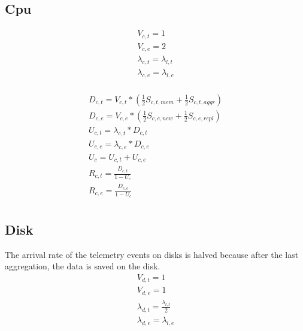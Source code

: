 \documentclass[11pt]{article}
\begin{document}
\subsection{Cpu}

\begin{equation}
    \begin{array}{l}
        V_{c, t} = 1 \\
        V_{c, e} = 2 \\ %
        \lambda_{c, t} = \lambda_{l, t} \\
        \lambda_{c, e} = \lambda_{l, e} \\
    \end{array}
\end{equation}

\begin{equation}
    \begin{array}{l}
        D_{c, t} = V_{c, t} * (\frac{1}{2}S_{c, t, mem} + \frac{1}{2}S_{c, t, aggr}) \\ %
        D_{c, e} = V_{c, e} * (\frac{1}{2}S_{c, e, new} + \frac{1}{2}S_{c, e, repl}) \\
        U_{c, t} = \lambda_{c, t} * D_{c, t} \\
        U_{c, e} = \lambda_{c, e} * D_{c, e} \\
        U_{c} = U_{c, t} + U_{c, e} \\
        R_{c, t} = \frac{D_{c, t}}{1 - U_{c}} \\
        R_{c, e} = \frac{D_{c, e}}{1 - U_{c}} \\
    \end{array}
\end{equation}

\subsection{Disk}
The arrival rate of the telemetry events on disks is halved because after the last aggregation, the data is saved on the disk.
\begin{equation}
    \begin{array}{l}
        V_{d, t} = 1 \\
        V_{d, e} = 1 \\
        \lambda_{d, t} = \frac{\lambda_{l, t}}{2} \\ %
        \lambda_{d, e} = \lambda_{l, e} \\
    \end{array}
\end{equation}
\end{document}
